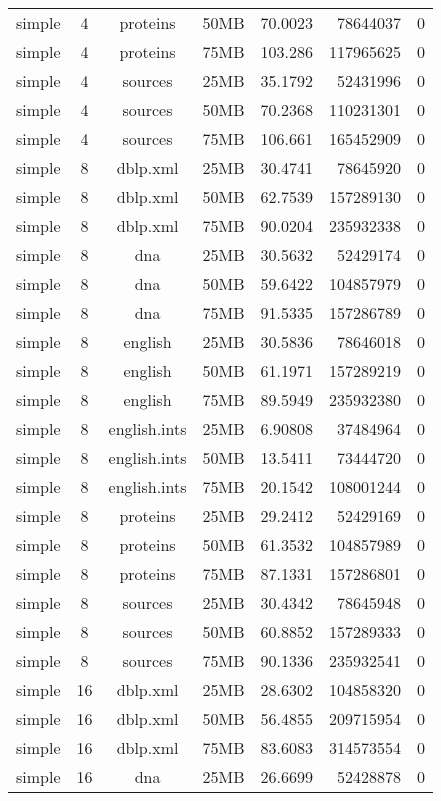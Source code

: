 \begin{table}[h]
\begin{center}
\begin{tabular}{ccccrrr}
simple & 4 & proteins & 50MB & 70.0023 & 78644037 & 0 \\
simple & 4 & proteins & 75MB & 103.286 & 117965625 & 0 \\
simple & 4 & sources & 25MB & 35.1792 & 52431996 & 0 \\
simple & 4 & sources & 50MB & 70.2368 & 110231301 & 0 \\
simple & 4 & sources & 75MB & 106.661 & 165452909 & 0 \\
simple & 8 & dblp.xml & 25MB & 30.4741 & 78645920 & 0 \\
simple & 8 & dblp.xml & 50MB & 62.7539 & 157289130 & 0 \\
simple & 8 & dblp.xml & 75MB & 90.0204 & 235932338 & 0 \\
simple & 8 & dna & 25MB & 30.5632 & 52429174 & 0 \\
simple & 8 & dna & 50MB & 59.6422 & 104857979 & 0 \\
simple & 8 & dna & 75MB & 91.5335 & 157286789 & 0 \\
simple & 8 & english & 25MB & 30.5836 & 78646018 & 0 \\
simple & 8 & english & 50MB & 61.1971 & 157289219 & 0 \\
simple & 8 & english & 75MB & 89.5949 & 235932380 & 0 \\
simple & 8 & english.ints & 25MB & 6.90808 & 37484964 & 0 \\
simple & 8 & english.ints & 50MB & 13.5411 & 73444720 & 0 \\
simple & 8 & english.ints & 75MB & 20.1542 & 108001244 & 0 \\
simple & 8 & proteins & 25MB & 29.2412 & 52429169 & 0 \\
simple & 8 & proteins & 50MB & 61.3532 & 104857989 & 0 \\
simple & 8 & proteins & 75MB & 87.1331 & 157286801 & 0 \\
simple & 8 & sources & 25MB & 30.4342 & 78645948 & 0 \\
simple & 8 & sources & 50MB & 60.8852 & 157289333 & 0 \\
simple & 8 & sources & 75MB & 90.1336 & 235932541 & 0 \\
simple & 16 & dblp.xml & 25MB & 28.6302 & 104858320 & 0 \\
simple & 16 & dblp.xml & 50MB & 56.4855 & 209715954 & 0 \\
simple & 16 & dblp.xml & 75MB & 83.6083 & 314573554 & 0 \\
simple & 16 & dna & 25MB & 26.6699 & 52428878 & 0 \\

\end{tabular}
\end{center}
\end{table}
